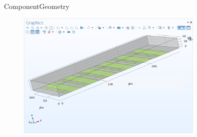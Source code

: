 \documentclass[10pt]{beamer}
\begin{document}
\begin{frame}{Component}{Geometry}
    \begin{figure}[H]
        \centering
        \includegraphics[width=0.8\textwidth]{1.png}
    \end{figure}
\end{frame}
\end{document}
